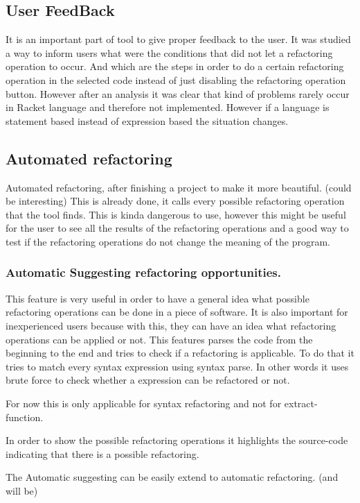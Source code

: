 \subsection{User FeedBack}
It is an important part of tool to give proper feedback to the user. It was studied
a way to inform users what were the conditions that did not let a refactoring operation
to occur. And which are the steps in order to do a certain refactoring
operation in the selected code instead of just disabling the refactoring operation
button. However after an analysis it was clear that kind of problems rarely occur
in Racket language and therefore not implemented. However if a language is statement
based instead of expression based the situation changes.

\subsection{Automated refactoring}
Automated refactoring, after finishing a project to make it more beautiful. (could be interesting)
This is already done, it calls every possible refactoring operation that the tool finds.
This is kinda dangerous to use, however this might be useful for the user to see all the results of the refactoring operations
and a good way to test if the refactoring operations do not change the meaning of the program.

\subsubsection{Automatic Suggesting refactoring opportunities.} %
This feature is very useful in order to have a general idea what possible refactoring
operations can be done in a piece of software. It is also important for inexperienced
users because with this, they can have an idea what refactoring operations can be applied or not.
This features parses the code from the beginning to the end and tries to check if a refactoring is applicable.
To do that it tries to match every syntax expression using syntax parse. In other words it
uses brute force to check whether a expression can be refactored or not.

For now this is only applicable for syntax refactoring and not for extract-function.

In order to show the possible refactoring operations it highlights the source-code indicating
that there is a possible refactoring.

The Automatic suggesting can be easily extend to automatic refactoring. (and will be)

